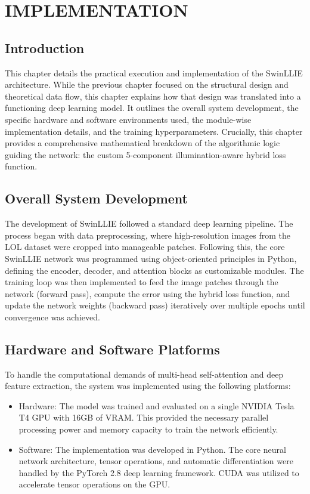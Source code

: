 \documentclass[12pt, a4paper]{report}
\begin{document}
\chapter{IMPLEMENTATION}
\section{Introduction}
This chapter details the practical execution and implementation of the SwinLLIE architecture. While the previous chapter focused on the structural design and theoretical data flow, this chapter explains how that design was translated into a functioning deep learning model. It outlines the overall system development, the specific hardware and software environments used, the module-wise implementation details, and the training hyperparameters. Crucially, this chapter provides a comprehensive mathematical breakdown of the algorithmic logic guiding the network: the custom 5-component illumination-aware hybrid loss function.

\section{Overall System Development}
The development of SwinLLIE followed a standard deep learning pipeline. The process began with data preprocessing, where high-resolution images from the LOL dataset were cropped into manageable patches. Following this, the core SwinLLIE network was programmed using object-oriented principles in Python, defining the encoder, decoder, and attention blocks as customizable modules. The training loop was then implemented to feed the image patches through the network (forward pass), compute the error using the hybrid loss function, and update the network weights (backward pass) iteratively over multiple epochs until convergence was achieved.

\section{Hardware and Software Platforms}
To handle the computational demands of multi-head self-attention and deep feature extraction, the system was implemented using the following platforms:
\begin{itemize}
    \item Hardware: The model was trained and evaluated on a single NVIDIA Tesla T4 GPU with 16GB of VRAM. This provided the necessary parallel processing power and memory capacity to train the network efficiently.
    \item Software: The implementation was developed in Python. The core neural network architecture, tensor operations, and automatic differentiation were handled by the PyTorch 2.8 deep learning framework. CUDA was utilized to accelerate tensor operations on the GPU.
\end{itemize}
\end{document}
